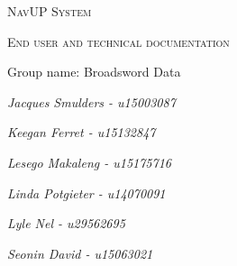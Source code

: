 \documentclass{article}
\begin{document}
\begin{titlepage}
	{\scshape\LARGE NavUP System\par}
	\vfill
	{\scshape\Large End user and technical documentation\par}
	\vfill
	{\Large Group name: Broadsword Data\par}
	\bigskip 
	{\itshape\Large Jacques Smulders - u15003087\par}	
	{\itshape\Large Keegan Ferret - u15132847\par}
	{\itshape\Large Lesego Makaleng - u15175716\par}
	{\itshape\Large Linda Potgieter - u14070091\par}
  {\itshape\Large Lyle Nel - u29562695\par}
	{\itshape\Large Seonin David - u15063021\par}
	\vfill
\end{titlepage}

\tableofcontents

\clearpage


	
\end{document}
